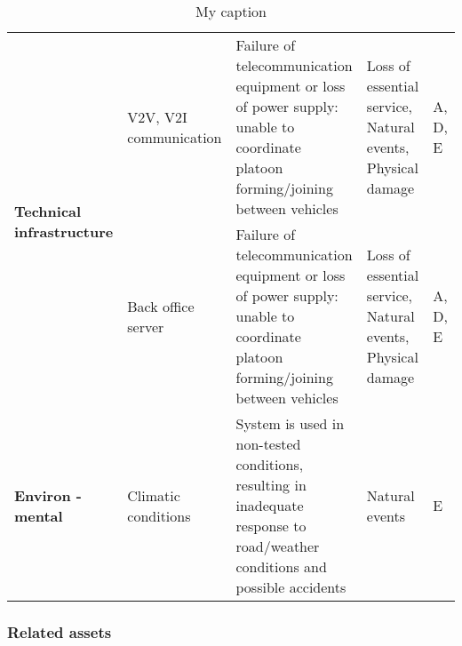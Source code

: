 \documentclass[british,11pt,a4paper]{article}
\begin{document}
\begin{table}[]
\begin{tabular}{|p{2cm}|p{2cm}|p{6cm}|p{3cm}|p{1.5cm}|}
\multirow{2}{2cm}{\textbf{Technical infrastructure}} & V2V, V2I communication & Failure of telecommunication equipment or loss of power supply: unable to coordinate platoon forming/joining between vehicles & Loss of essential service, Natural events, Physical damage & A, D, E \\ \cline{2-5} 
 & Back office server & Failure of telecommunication equipment or loss of power supply: unable to coordinate platoon forming/joining between vehicles & Loss of essential service, Natural events, Physical damage & A, D, E \\ \hline
\textbf{Environ - mental} & Climatic conditions & System is used in non-tested conditions, resulting in inadequate response to road/weather conditions and possible accidents & Natural events & E \\ \hline
\end{tabular}
\caption{My caption}
\label{my-label}
\end{table}


\subsubsection{Related assets}
\end{document}
